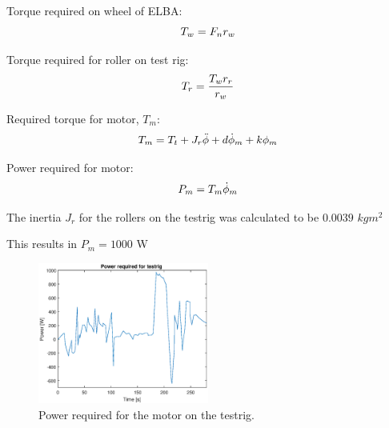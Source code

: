 Torque required on wheel of ELBA:$$T_w = F_n\*r_w$$

Torque required for roller on test rig: $$T_r = \frac{T_w\*r_r}{r_w}$$

Required torque for motor, $T_m$: $$T_m = T_t + J_r\*\ddot{\phi} + d\*\dot{\phi}_m + k\*\phi_m$$

Power required for motor: $$P_m = T_m\*\dot{\phi}_m$$

The inertia $J_r$ for the rollers on the testrig was calculated to be $0.0039$ $kgm^2$

This results in $P_m = 1000$ W

\begin{figure}[H]
    \label{fig:testrig_power_required}
    \centering
    \includegraphics[width=0.5\textwidth]{./img/testrig_power_required.eps}
    \caption{Power required for the motor on the testrig.}
\end{figure}
